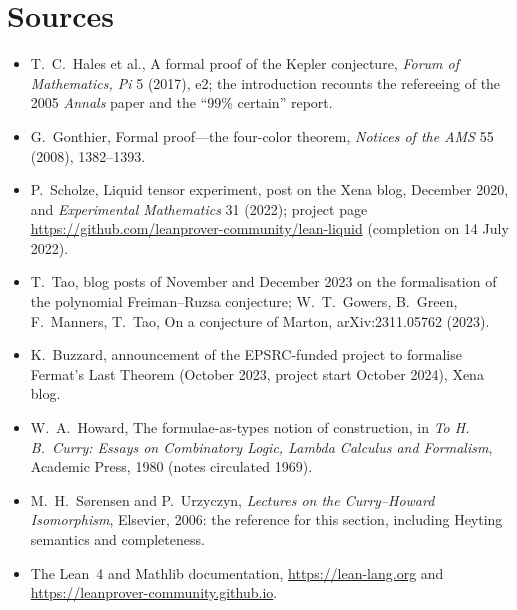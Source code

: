\section{Sources}

\begin{itemize}
\item T.~C.~Hales et al., A formal proof of the Kepler conjecture, \emph{Forum of Mathematics, Pi} 5 (2017), e2; the introduction recounts the refereeing of the 2005 \emph{Annals} paper and the ``99\% certain'' report.
\item G.~Gonthier, Formal proof---the four-color theorem, \emph{Notices of the AMS} 55 (2008), 1382--1393.
\item P.~Scholze, Liquid tensor experiment, post on the Xena blog, December 2020, and \emph{Experimental Mathematics} 31 (2022); project page \url{https://github.com/leanprover-community/lean-liquid} (completion on 14 July 2022).
\item T.~Tao, blog posts of November and December 2023 on the formalisation of the polynomial Freiman--Ruzsa conjecture; W.~T.~Gowers, B.~Green, F.~Manners, T.~Tao, On a conjecture of Marton, arXiv:2311.05762 (2023).
\item K.~Buzzard, announcement of the EPSRC-funded project to formalise Fermat's Last Theorem (October 2023, project start October 2024), Xena blog.
\item W.~A.~Howard, The formulae-as-types notion of construction, in \emph{To H.\,B.~Curry: Essays on Combinatory Logic, Lambda Calculus and Formalism}, Academic Press, 1980 (notes circulated 1969).
\item M.~H.~S{\o}rensen and P.~Urzyczyn, \emph{Lectures on the Curry--Howard Isomorphism}, Elsevier, 2006: the reference for this section, including Heyting semantics and completeness.
\item The Lean~4 and Mathlib documentation, \url{https://lean-lang.org} and \url{https://leanprover-community.github.io}.
\end{itemize}
